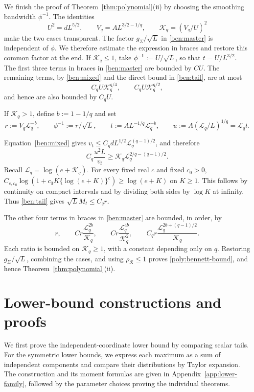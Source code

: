 \documentclass[11pt,letterpaper]{article}
\newcommand{\vSix}[1]{{\color{magenta}#1}}
\newenvironment{vSixBlock}{\color{magenta}}{}
\theoremstyle{remark}
\newcommand{\rh}{\rho_{\mathcal R}}
\begin{document}
We finish the proof of Theorem~\ref{thm:polynomial}\textup{(ii)} by choosing the
smoothing bandwidth \(\phi^{-1}\). The identities
\[
 U^2=dL^{5/2},\qquad V_q=AL^{3/2-1/q},\qquad
 \mathcal K_q=(V_q/U)^2
\]
make the two cases transparent.
\vSix{The factor \(g_\Sigma/\sqrt L\) in \eqref{ben:master} is
independent of \(\phi\). We therefore estimate the expression in
braces and restore this common factor at the end.} If \(\mathcal K_q\le1\), take
\(\phi^{-1}:=U/\sqrt L\), so that \(t=U/L^{3/2}\).
\vSix{The first three terms in braces in \eqref{ben:master} are bounded by \(CU\).}
The remaining terms, by \eqref{ben:mixed} and the direct bound in
\eqref{ben:tail}, are at most
\[
 C_qU \mathcal K_q^{q/4},\qquad C_qU \mathcal K_q^{q/2},
\]
and hence are also bounded by \(C_qU\).

If \(\mathcal K_q>1\), {define} \(b:=1-1/q\) and set
\[
 r:=V_q \mathcal{L}_q^{-b},\qquad \phi^{-1}:=r/\sqrt L,\qquad
 t:=AL^{-1/q}\mathcal{L}_q^{-b},\qquad u:=A(\mathcal{L}_q/L)^{1/q}=\mathcal{L}_q t.
\]
{
Equation~\eqref{ben:mixed} gives
\(v_t\le C_q dL^{1/2}\mathcal{L}_q^{(q-1)/2}\), and therefore
\[
 C_q\frac{u^2L}{v_t}\ge
 \mathcal K_q \mathcal{L}_q^{2/q-(q-1)/2}.
\]
Recall $\mathcal L_q=\log(e+\mathcal K_q)$. 
For every fixed real \(c\) and fixed \(c_0>0\),
\(C_{c,c_0}\log(1+c_0K\{\log(e+K)\}^c)\ge\log(e+K)\)
on \(K\ge1\). This follows by continuity on compact intervals and
by dividing both sides by \(\log K\) at infinity. Thus
\eqref{ben:tail} gives \(\sqrt L M_t\le C_q r\).

}\vSix{The other four terms in braces in \eqref{ben:master} are bounded, in order, by}
\[
 r,\qquad C r\frac{\mathcal{L}_q^{2b}}{\mathcal K_q},\qquad
 C r\frac{\mathcal{L}_q^{4b}}{\mathcal K_q^2},\qquad
 C_q r\frac{\mathcal{L}_q^{2b+(q-1)/2}}{\mathcal K_q}.
\]
\begin{vSixBlock}
Each ratio is bounded on \(\mathcal K_q\ge1\), with a constant
depending only on \(q\). Restoring \(g_\Sigma/\sqrt L\), combining
the cases, and using \(\rh\le1\) proves
\eqref{poly:bennett-bound}, and hence
Theorem~\ref{thm:polynomial}\textup{(ii)}.
\end{vSixBlock}


\section{\vSix{Lower-bound constructions and proofs}}\label{app:sharpness-proofs}

We first prove the independent-coordinate lower bound by comparing
scalar tails. For the symmetric lower bounds, we express each maximum
as a sum of independent components and compare their distributions
by Taylor expansion. The construction and its moment formulas are
given in Appendix~\ref{app:lower-family}, followed by the parameter
choices proving the individual theorems.
\end{document}
